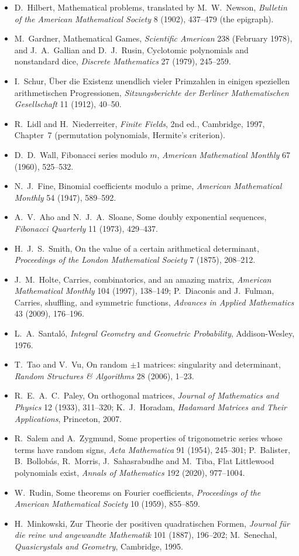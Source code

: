 \begin{itemize}
\item D.~Hilbert, Mathematical problems, translated by M.~W.~Newson, \emph{Bulletin of the American Mathematical Society} 8 (1902),
437--479 (the epigraph).
\item M.~Gardner, Mathematical Games, \emph{Scientific American} 238 (February 1978), and J.~A.~Gallian and D.~J.~Rusin,
Cyclotomic polynomials and nonstandard dice, \emph{Discrete Mathematics} 27 (1979), 245--259.
\item I.~Schur, Über die Existenz unendlich vieler Primzahlen in einigen speziellen arithmetischen Progressionen,
\emph{Sitzungsberichte der Berliner Mathematischen Gesellschaft} 11 (1912), 40--50.
\item R.~Lidl and H.~Niederreiter, \emph{Finite Fields}, 2nd ed., Cambridge, 1997, Chapter~7 (permutation polynomials, Hermite's
criterion).
\item D.~D.~Wall, Fibonacci series modulo $m$, \emph{American Mathematical Monthly} 67 (1960), 525--532.
\item N.~J.~Fine, Binomial coefficients modulo a prime, \emph{American Mathematical Monthly} 54 (1947), 589--592.
\item A.~V.~Aho and N.~J.~A.~Sloane, Some doubly exponential sequences, \emph{Fibonacci Quarterly} 11 (1973), 429--437.
\item H.~J.~S.~Smith, On the value of a certain arithmetical determinant, \emph{Proceedings of the London Mathematical Society}
7 (1875), 208--212.
\item J.~M.~Holte, Carries, combinatorics, and an amazing matrix, \emph{American Mathematical Monthly} 104 (1997), 138--149;
P.~Diaconis and J.~Fulman, Carries, shuffling, and symmetric functions, \emph{Advances in Applied Mathematics} 43 (2009),
176--196.
\item L.~A.~Santaló, \emph{Integral Geometry and Geometric Probability}, Addison-Wesley, 1976.
\item T.~Tao and V.~Vu, On random $\pm1$ matrices: singularity and determinant, \emph{Random Structures \& Algorithms} 28 (2006),
1--23.
\item R.~E.~A.~C.~Paley, On orthogonal matrices, \emph{Journal of Mathematics and Physics} 12 (1933), 311--320; K.~J.~Horadam,
\emph{Hadamard Matrices and Their Applications}, Princeton, 2007.
\item R.~Salem and A.~Zygmund, Some properties of trigonometric series whose terms have random signs, \emph{Acta Mathematica}
91 (1954), 245--301; P.~Balister, B.~Bollobás, R.~Morris, J.~Sahasrabudhe and M.~Tiba, Flat Littlewood polynomials exist,
\emph{Annals of Mathematics} 192 (2020), 977--1004.
\item W.~Rudin, Some theorems on Fourier coefficients, \emph{Proceedings of the American Mathematical Society} 10 (1959),
855--859.
\item H.~Minkowski, Zur Theorie der positiven quadratischen Formen, \emph{Journal für die reine und angewandte Mathematik}
101 (1887), 196--202; M.~Senechal, \emph{Quasicrystals and Geometry}, Cambridge, 1995.
\end{itemize}
